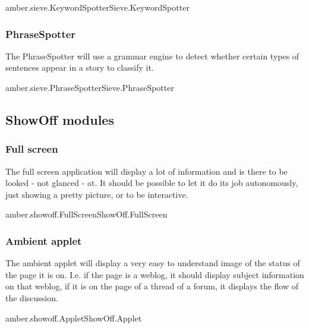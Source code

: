 \begin{module}{amber.sieve.KeywordSpotter}{Sieve.KeywordSpotter}
\end{module}

\subsubsection{PhraseSpotter}

The PhraseSpotter will use a grammar engine to detect whether certain types of
sentences appear in a story to classify it.

\begin{module}{amber.sieve.PhraseSpotter}{Sieve.PhraseSpotter}
\end{module}

\subsection{ShowOff modules}

\subsubsection{Full screen}

The full screen application will display a lot of information and is there to
be looked - not glanced - at. It should be possible to let it do its job
autonomously, just showing a pretty picture, or to be interactive.

\begin{module}{amber.showoff.FullScreen}{ShowOff.FullScreen}
\end{module}

\subsubsection{Ambient applet}

The ambient applet will display a very easy to understand image of the status
of the page it is on. I.e. if the page is a weblog, it should display subject
information on that weblog, if it is on the page of a thread of a forum, it
displays the flow of the discussion.

\begin{module}{amber.showoff.Applet}{ShowOff.Applet}
\end{module}

